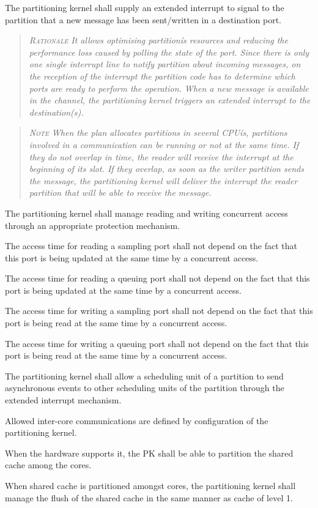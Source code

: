 The partitioning kernel shall supply an extended interrupt to signal to the partition that a new message has been sent/written in a destination port.
\begin{quote}\it
\textsc{Rationale}
It allows optimising partitionís resources and reducing the performance loss caused by polling the state of the port. Since there is only one single interrupt line to notify partition about incoming messages, on the reception of the interrupt the partition code has to determine which ports are ready to perform the operation.
When a new message is available in the channel, the partitioning kernel triggers an extended interrupt to the destination(s).
\end{quote}
\begin{quote}\it
\textsc{Note}
When the plan allocates partitions in several CPUís, partitions involved in a communication can be running or not at the same time. If they do not overlap in time, the reader will receive the interrupt at the beginning of its slot. If they overlap, as soon as the writer partition sends the message, the partitioning kernel will deliver the interrupt the reader partition that will be able to receive the message.
\end{quote}

The partitioning kernel shall manage reading and writing concurrent access through an appropriate protection mechanism.

The access time for reading a sampling port shall not depend on the fact that this port is being updated at the same time by a concurrent access.

The access time for reading a queuing port shall not depend on the fact that this port is being updated at the same time by a concurrent access.

The access time for writing a sampling port shall not depend on the fact that this port is being read at the same time by a concurrent access.

The access time for writing a queuing port shall not depend on the fact that this port is being read at the same time by a concurrent access.

The partitioning kernel shall allow a scheduling unit of a partition to send asynchronous events to other scheduling units of the partition through the extended interrupt mechanism.

Allowed inter-core communications are defined by configuration of the partitioning kernel.

When the hardware supports it, the PK shall be able to partition the shared cache among the cores.

When shared cache is partitioned amongst cores, the partitioning kernel shall manage the flush of the shared cache in the same manner as cache of level 1.
